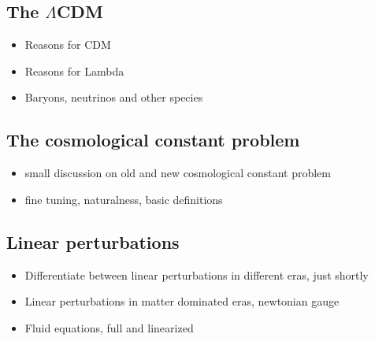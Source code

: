 \subsection{The $\Lambda$CDM }

\begin{itemize}
\item Reasons for CDM
\item Reasons for Lambda
\item Baryons, neutrinos and other species
\end{itemize}

\subsection{The cosmological constant problem \label{sub:CC-problem}}

\begin{itemize}
\item small discussion on old and new cosmological constant problem
\item fine tuning, naturalness, basic definitions
\end{itemize}

\subsection{Linear perturbations}

\begin{itemize}
\item Differentiate between linear perturbations in different eras, just shortly
\item Linear perturbations in matter dominated eras, newtonian gauge
\item Fluid equations, full and linearized
\end{itemize}



